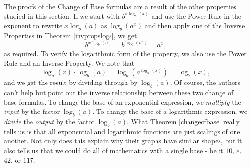 \smallskip

The proofs of the Change of Base formulas are a result of the other properties studied in this section.  If we start with $b^{x \log_{b}(a)}$ and use the Power Rule in the exponent to rewrite $x \log_{b}(a)$ as $\log_{b}\left(a^{x}\right)$ and then apply one of the Inverse Properties in Theorem \ref{invpropslogs}, we get \[ b^{x \log_{b}(a)} = b^{\log_{b}\left(a^{x}\right)} = a^{x},\] as required.  To verify the logarithmic form of the property, we also use the Power Rule and an Inverse Property. We note that \[\log_{a}(x) \cdot \log_{b}(a) =  \log_{b} \left(a^{\log_{a}(x)}\right) = \log_{b}(x),\] and we get the result by dividing through by $\log_{b}(a)$.  Of course, the authors can't help but point out the inverse relationship between these two change of base formulas.  To change the base of an exponential expression, we \textit{multiply} the \textit{input} by the factor $\log_{b}(a)$.  To change the base of a logarithmic expression, we \textit{divide} the \textit{output} by the factor $\log_{b}(a)$.   What Theorem \ref{changeofbase} really tells us is that all exponential and logarithmic functions are just scalings of one another.  Not only does this explain why their graphs have similar shapes, but it also tells us that we could do all of mathematics with a single base - be it $10$, $e$, $42$, or $117$. 


